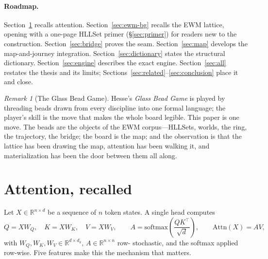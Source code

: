 \documentclass[11pt,a4paper]{article}
\theoremstyle{remark}
\newtheorem{remark}[principle]{Remark}
\newcommand{\Attn}{\ensuremath{\mathrm{Attn}}}          %
\begin{document}
\paragraph{Roadmap.} Section~\ref{sec:attn} recalls attention.
Section~\ref{sec:ewm-bg} recalls the EWM lattice, opening with a one-page
HLLSet primer (\S\ref{sec:primer}) for readers new to the construction.
Section~\ref{sec:bridge}
proves the seam. Section~\ref{sec:map} develops the map-and-journey integration.
Section~\ref{sec:dictionary} states the structural dictionary.
Section~\ref{sec:engine} describes the exact engine.
Section~\ref{sec:all} restates the thesis and its limits;
Sections~\ref{sec:related}--\ref{sec:conclusion} place it and close.

\begin{remark}[The Glass Bead Game]
Hesse's \emph{Glass Bead Game} \cite{hess1943} is played by threading beads
drawn from every discipline into one formal language; the player's skill is the
move that makes the whole board legible. This paper is one move. The beads are
the objects of the EWM corpus---HLLSets, worlds, the ring, the trajectory, the
bridge; the board is the map; and the observation is that the lattice has been
drawing the map, attention has been walking it, and materialization has been the
door between them all along.
\end{remark}

\section{Attention, recalled}
\label{sec:attn}

Let $X\in\mathbb{R}^{n\times d}$ be a sequence of $n$ token states. A single
head computes
\begin{equation}
\label{eq:attn}
Q=XW_Q,\quad K=XW_K,\quad V=XW_V,\qquad
A=\mathrm{softmax}\!\left(\frac{QK^{\top}}{\sqrt d}\right),\qquad
\Attn(X)=AV,
\end{equation}
with $W_Q,W_K,W_V\in\mathbb{R}^{d\times d_k}$, $A\in\mathbb{R}^{n\times n}$ row-
stochastic, and the softmax applied row-wise. Five features make this the
mechanism that matters.
\end{document}
